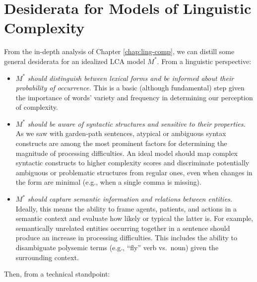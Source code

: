 \documentclass[a4paper, nobind]{templates/ociamthesis}
\begin{document}
\hypertarget{subchap:desiderata}{%
\section{Desiderata for Models of Linguistic Complexity}\label{subchap:desiderata}}

From the in-depth analysis of Chapter \ref{chap:ling-comp}, we can distill some general desiderata for an idealized LCA model \(M^*\). From a linguistic perspective:

\begin{itemize}
\item
  \(M^*\) \emph{should distinguish between lexical forms and be informed about their probability of occurrence.} This is a basic (although fundamental) step given the importance of words' variety and frequency in determining our perception of complexity.
\item
  \(M^*\) \emph{should be aware of syntactic structures and sensitive to their properties.} As we saw with garden-path sentences, atypical or ambiguous syntax constructs are among the most prominent factors for determining the magnitude of processing difficulties. An ideal model should map complex syntactic constructs to higher complexity scores and discriminate potentially ambiguous or problematic structures from regular ones, even when changes in the form are minimal (e.g., when a single comma is missing).
\item
  \(M^*\) \emph{should capture semantic information and relations between entities.} Ideally, this means the ability to frame agents, patients, and actions in a semantic context and evaluate how likely or typical the latter is. For example, semantically unrelated entities occurring together in a sentence should produce an increase in processing difficulties. This includes the ability to disambiguate polysemic terms (e.g., ``fly'' verb vs.~noun) given the surrounding context.
\end{itemize}

Then, from a technical standpoint:
\end{document}
